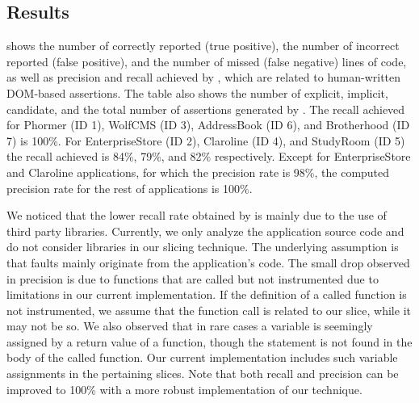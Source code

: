 \subsection{Results} \label{Sec:results}
 shows the number of  correctly reported (true positive), the number of incorrect reported (false positive), and the number of missed (false negative) \javascript lines of code, as well as precision and recall achieved by \atrina, which are related to human-written DOM-based assertions. The table also shows the number of explicit, implicit, candidate, and the total number of assertions generated by \atrina. The recall achieved for Phormer (ID 1), WolfCMS (ID 3), AddressBook (ID 6), and Brotherhood (ID 7) is 100\%. For EnterpriseStore (ID 2), Claroline (ID 4), and StudyRoom (ID 5) the recall achieved is 84\%, 79\%, and 82\% respectively. Except for EnterpriseStore and Claroline applications, for which the precision rate is 98\%, the computed precision rate for the rest of applications is 100\%.

We noticed that the lower recall rate obtained by \atrina is mainly due to the use of third party libraries. Currently, we only analyze the application source code and do not consider libraries in our slicing technique. The underlying assumption is that faults mainly originate from the application's code. The small drop observed in precision is due to functions that are called but not instrumented due to limitations in our current implementation. If the definition of a called function is not instrumented, we assume that the function call is related to our slice, while it may not be so. 
We also observed that in rare cases a variable is seemingly assigned by a return value of a function, though the  statement is not found in the body of the called function. Our current implementation includes such variable assignments in the pertaining slices. 
Note that both recall and precision can be improved to 100\% with a more robust implementation of our technique. 


